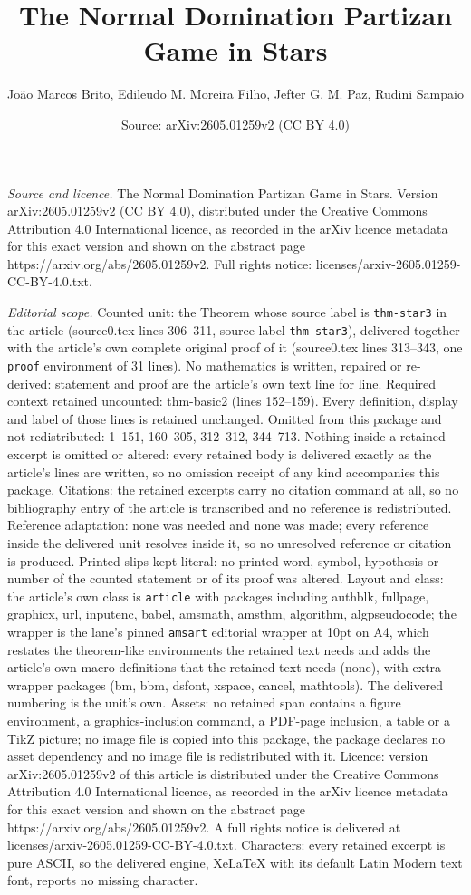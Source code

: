\documentclass[10pt,a4paper]{amsart}
\title[The Normal Domination Partizan Game in Stars]{The Normal Domination Partizan Game in Stars}
\author{Jo\~ao Marcos Brito, Edileudo M. Moreira Filho, Jefter G. M. Paz, Rudini Sampaio}
\date{Source: arXiv:2605.01259v2 (CC BY 4.0)}
\begin{document}
\maketitle

\noindent\emph{Source and licence.} The Normal Domination Partizan Game in Stars. Version arXiv:2605.01259v2 (CC BY 4.0), distributed under the Creative Commons Attribution 4.0 International licence, as recorded in the arXiv licence metadata for this exact version and shown on the abstract page https://arxiv.org/abs/2605.01259v2. Full rights notice: licenses/arxiv-2605.01259-CC-BY-4.0.txt.\par\smallskip

\noindent\textit{Editorial scope.} Counted unit: the Theorem whose source label is \texttt{thm-star3} in the article (source0.tex lines 306--311, source label \texttt{thm-star3}), delivered together with the article's own complete original proof of it (source0.tex lines 313--343, one \texttt{proof} environment of 31 lines). No mathematics is written, repaired or re-derived: statement and proof are the article's own text line for line. Required context retained uncounted: thm-basic2 (lines 152--159). Every definition, display and label of those lines is retained unchanged. Omitted from this package and not redistributed: 1--151, 160--305, 312--312, 344--713. Nothing inside a retained excerpt is omitted or altered: every retained body is delivered exactly as the article's lines are written, so no omission receipt of any kind accompanies this package. Citations: the retained excerpts carry no citation command at all, so no bibliography entry of the article is transcribed and no reference is redistributed. Reference adaptation: none was needed and none was made; every reference inside the delivered unit resolves inside it, so no unresolved reference or citation is produced. Printed slips kept literal: no printed word, symbol, hypothesis or number of the counted statement or of its proof was altered. Layout and class: the article's own class is \texttt{article} with packages including authblk, fullpage, graphicx, url, inputenc, babel, amsmath, amsthm, algorithm, algpseudocode; the wrapper is the lane's pinned \texttt{amsart} editorial wrapper at 10pt on A4, which restates the theorem-like environments the retained text needs and adds the article's own macro definitions that the retained text needs (none), with extra wrapper packages (bm, bbm, dsfont, xspace, cancel, mathtools). The delivered numbering is the unit's own. Assets: no retained span contains a figure environment, a graphics-inclusion command, a PDF-page inclusion, a table or a TikZ picture; no image file is copied into this package, the package declares no asset dependency and no image file is redistributed with it. Licence: version arXiv:2605.01259v2 of this article is distributed under the Creative Commons Attribution 4.0 International licence, as recorded in the arXiv licence metadata for this exact version and shown on the abstract page https://arxiv.org/abs/2605.01259v2. A full rights notice is delivered at licenses/arxiv-2605.01259-CC-BY-4.0.txt. Characters: every retained excerpt is pure ASCII, so the delivered engine, XeLaTeX with its default Latin Modern text font, reports no missing character.
\end{document}
